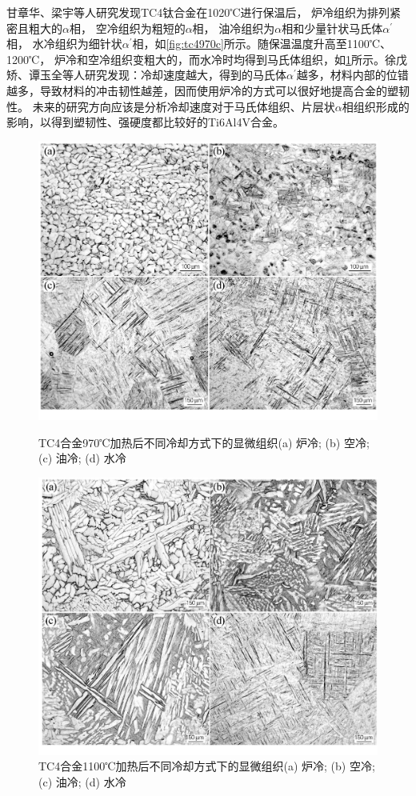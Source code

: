 \documentclass[
class = book,
zihao = -4,
font = noto,
paper = a4paper,
openany
]{easybook}
\newcommand{\ti}{Ti6Al4V}
\begin{document}
甘章华、梁宇等人研究发现\cite{ganzhanghuaRechuligongyiduiTC4taihejinzuzhijiyingdudeyingxiang2014}TC4钛合金在1020℃进行保温后， 炉冷组织为排列紧密且粗大的$\alpha $相， 空冷组织为粗短的$\alpha $相， 油冷组织为$\alpha $相和少量针状马氏体$\alpha^{'}$相， 水冷组织为细针状$\alpha^{'}$相，如\ref{fig:tc4970c}所示。随保温温度升高至1100℃、1200℃， 炉冷和空冷组织变粗大的，而水冷时均得到马氏体组织，如\ref{fig:tc41100c}所示。徐戊矫、谭玉全等人研究\cite{xuwujiaoTuihuowenduhelengquesushuaiduiTC4taihejinzuzhihexingnengdeyingxiang2016}发现：冷却速度越大，得到的马氏体$ \alpha^{'} $越多，材料内部的位错越多，导致材料的冲击韧性越差，因而使用炉冷的方式可以很好地提高合金的塑韧性。 未来的研究方向应该是分析冷却速度对于马氏体组织、片层状$ \alpha $相组织形成的影响，以得到塑韧性、强硬度都比较好的\ti 合金。
\begin{figure}[htbp]
	\centering
	\begin{minipage}[t]{0.48\textwidth}
	\centering
	\includegraphics[width=0.7\linewidth]{TC4合金970℃加热后不同冷却方式下的显微组织}
\caption{TC4合金970℃加热后不同冷却方式下的显微组织\cite{ganzhanghuaRechuligongyiduiTC4taihejinzuzhijiyingdudeyingxiang2014}(a) 炉冷; (b) 空冷; (c) 油冷; (d) 水冷}
\label{fig:tc4970c}
	\end{minipage}
	\begin{minipage}[t]{0.48\textwidth}
	\centering
\includegraphics[width=0.7\linewidth]{TC4合金1100℃加热后不同冷却方式下的显微组织}
\caption{TC4合金1100℃加热后不同冷却方式下的显微组织(a) 炉冷; (b) 空冷; (c) 油冷; (d) 水冷}
\label{fig:tc41100c}
	\end{minipage}
\end{figure}
\end{document}
